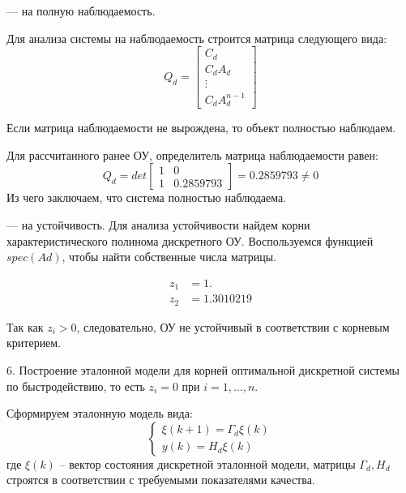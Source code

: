 \documentclass[a4paper,14pt]{extreport}
\begin{document}
	— на полную наблюдаемость.
	
	Для анализа системы на наблюдаемость строится матрица следующего вида:
	\begin{equation}
	Q_d =
	\begin{bmatrix}
	C_d\\
	C_d A_d\\
	\vdots\\
	
	C_d A_d^{n-1}
	\end{bmatrix}
	\end{equation}
	
	Если матрица наблюдаемости не вырождена, то объект полностью наблюдаем.
	
	Для рассчитанного ранее ОУ, определитель матрица наблюдаемости равен:
	\begin{equation}
	Q_d =det
	\begin{bmatrix}
	1&    0\\         
	1 &   0.2859793  
	\end{bmatrix}
	=0.2859793  \ne 0
	\end{equation}
	Из чего заключаем, что система полностью наблюдаема.
	
	— на устойчивость.
	Для анализа устойчивости найдем корни характеристического полинома дискретного ОУ. Воспользуемся функцией $spec(Ad)$, чтобы найти собственные числа матрицы.
	
	\begin{align}
	z_1 &= 1. \\ 
	z_2 &= 1.3010219  
	\end{align}
	
	Так как $z_i > 0$, следовательно, ОУ не устойчивый в соответствии с
	корневым критерием.
	
	6. Построение эталонной модели для корней оптимальной дискретной системы по быстродействию, то есть $z_i = 0$ при $i = 1,...,n$.
	
	Сформируем эталонную модель вида:
	\begin{equation}
	\begin{cases}
	\xi(k+1) = \Gamma_d \xi(k)\\
	y(k) = H_d \xi(k)
	\end{cases}
	\end{equation}
	где $\xi(k)$ -- вектор состояния дискретной эталонной модели, матрицы $\Gamma_d, H_d$ строятся в соответствии с требуемыми показателями качества.
	
\end{document}
